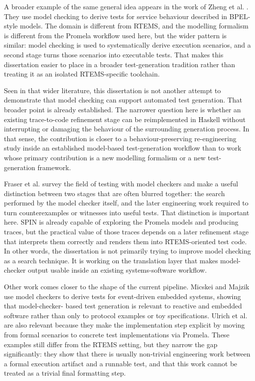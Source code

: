 A broader example of the same general idea appears in the work of
Zheng et al. \citep{zheng2007model}. They use model checking to derive
tests for service behaviour described in BPEL-style models. The domain
is different from RTEMS, and the modelling formalism is different
from the Promela workflow used here, but the wider pattern is similar:
model checking is used to systematically derive execution scenarios,
and a second stage turns those scenarios into executable tests. That
makes this dissertation easier to place in a broader test-generation
tradition rather than treating it as an isolated RTEMS-specific
toolchain.

Seen in that wider literature, this dissertation is not another
attempt to demonstrate that model checking can support automated test
generation. That broader point is already established. The narrower
question here is whether an existing trace-to-code refinement stage
can be reimplemented in Haskell without interrupting or damaging the
behaviour of the surrounding generation process. In that sense, the
contribution is closer to a behaviour-preserving re-engineering study
inside an established model-based test-generation workflow than to
work whose primary contribution is a new modelling formalism or a new
test-generation framework.

Fraser et al. \citep{fraser2009testing} survey the field of testing
with model checkers and make a useful distinction between two stages
that are often blurred together: the search performed by the model
checker itself, and the later engineering work required to turn
counterexamples or witnesses into useful tests. That distinction is
important here. SPIN is already capable of exploring the Promela
models and producing traces, but the practical value of those traces
depends on a later refinement stage that interprets them correctly and
renders them into RTEMS-oriented test code. In other words, the
dissertation is not primarily trying to improve model checking as a
search technique. It is working on the translation layer that makes
model-checker output usable inside an existing systems-software
workflow.

Other work comes closer to the shape of the current pipeline. Micskei
and Majzik \citep{micskei2006modelbased} use model checkers to derive
tests for event-driven embedded systems, showing that model-checker-
based test generation is relevant to reactive and embedded software
rather than only to protocol examples or toy specifications. Ulrich
et al. \citep{ulrich2010scenarios} are also relevant because they make
the implementation step explicit by moving from formal scenarios to
concrete test implementations via Promela. These examples still differ
from the RTEMS setting, but they narrow the gap significantly: they
show that there is usually non-trivial engineering work between a
formal execution artifact and a runnable test, and that this work
cannot be treated as a trivial final formatting step.

